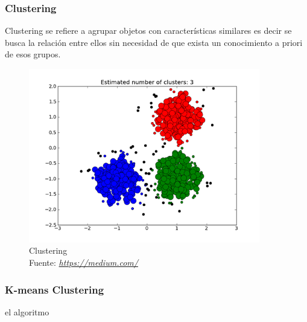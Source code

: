 \subsubsection*{Clustering}
Clustering se refiere a agrupar objetos con características similares es decir se busca la relación entre ellos sin necesidad de que exista un conocimiento a priori de esos grupos.
\begin{figure}[H]
	\centering
	\includegraphics[width=0.9\textwidth]{Figures/clustering.png}
	\caption{Clustering \\ Fuente:  \href{https://medium.com/deep-math-machine-learning-ai/different-types-of-machine-learning-and-their-types-34760b9128a2}{\textit{https://medium.com/}}}
	\label{Clustering}
\end{figure} 
\subsubsection*{K-means Clustering}
el algoritmo
